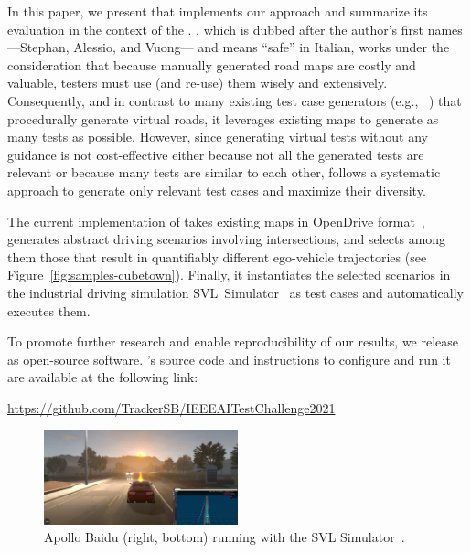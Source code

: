 \documentclass[conference]{IEEEtran}
\begin{document}
In this paper, we present \tool that implements our approach and summarize its evaluation in the context of the \challenge.
\tool, which is dubbed after the author's first names ---Stephan, Alessio, and Vuong--- and means ``safe'' in Italian, works under the consideration that because manually generated road maps are costly and valuable, testers must use (and re-use) them wisely and extensively. 
Consequently, and in contrast to many existing test case generators (e.g., ~\cite{DBLP:conf/icse/GambiMF19,DBLP:conf/icse/HuynhGF19,DBLP:conf/sigsoft/RiccioT20,DBLP:conf/issta/ZohdinasabRGT21,DBLP:conf/sbst/PanichellaGZR21}) that procedurally generate virtual roads, it leverages existing maps to generate as many tests as possible.
%
However, since generating virtual tests without any guidance is not cost-effective either because not all the generated tests are relevant or because many tests are similar to each other, \tool follows a systematic approach to generate only relevant test cases and maximize their diversity.

The current implementation of \tool takes existing maps in OpenDrive format~\cite{dupuis2010opendrive}, generates abstract driving scenarios involving intersections, and selects among them those that result in quantifiably different ego-vehicle trajectories (see Figure~\ref{fig:samples-cubetown}). Finally, it instantiates the selected scenarios in the industrial driving simulation SVL~Simulator~\cite{rong2020lgsvl} as test cases and automatically executes them.

To promote further research and enable reproducibility of our results, we release \tool as open-source software. \tool's source code and instructions to configure and run it are available at the following link:
\begin{center}
\href{https://github.com/TrackerSB/IEEEAITestChallenge2021}{https://github.com/TrackerSB/IEEEAITestChallenge2021}
\end{center}

\begin{figure}[tp]
  \centering
    \includegraphics[width=0.5\textwidth]{images/apollo-sim}
  \caption{Apollo Baidu (right, bottom) running with the SVL Simulator~\cite{svl-website}.}
  \label{fig:apollosim}
\end{figure}
\end{document}
